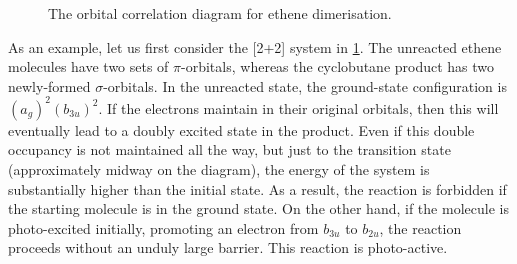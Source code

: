 \documentclass{article}
\theoremstyle{plain}\theoremheaderfont{\normalfont\itshape}\theorembodyfont{\rmfamily}\theoremseparator{.}\newtheorem*{rem}{Remark}\newtheorem*{ex}{Example}\newtheorem*{proof}{Proof}\newtheorem*{altp}{Alternative proof}
\theoremstyle{plain}\theoremheaderfont{\normalfont\bfseries}\theorembodyfont{\rmfamily}\theoremseparator{.}\newtheorem{thm}{Theorem}[section]\newtheorem{lem}[thm]{Lemma}\newtheorem{prop}[thm]{Proposition}\newtheorem*{cor}{Corollary}\newtheorem{defn}[thm]{Definition}\newtheorem{clm}[thm]{Claim}\newtheorem{clminproof}{Claim}\newtheorem{pos}{Postulate}[section]
\theoremstyle{break}\theoremheaderfont{\normalfont\itshape}\theorembodyfont{\rmfamily}\theoremseparator{.\medskip}\newtheorem*{proofskip}{Proof}\newtheorem*{exs}{Examples}\newtheorem*{rems}{Remarks}
\theoremstyle{break}\theoremheaderfont{\normalfont\bfseries}\theorembodyfont{\rmfamily}\theoremseparator{.\medskip}\newtheorem{lemskip}[thm]{Lemma}\newtheorem{defnskip}[thm]{Definition}\newtheorem{propskip}[thm]{Proposition}\newtheorem{thmskip}[thm]{Theorem}
\numberwithin{equation}{section}
\begin{document}
\begin{figure}
        \caption{The orbital correlation diagram for ethene dimerisation.}
        \label{ethene_correlation}
    \end{figure}

    As an example, let us first consider the [2+2] system in \cref{ethene_correlation}. The unreacted ethene molecules have two sets of \(\pi\)-orbitals, whereas the cyclobutane product has two newly-formed \(\sigma\)-orbitals. In the unreacted state, the ground-state configuration is \((a_g)^2(b_{3u})^2\). If the electrons maintain in their original orbitals, then this will eventually lead to a doubly excited state in the product. Even if this double occupancy is not maintained all the way, but just to the transition state (approximately midway on the diagram), the energy of the system is substantially higher than the initial state. As a result, the reaction is forbidden if the starting molecule is in the ground state. On the other hand, if the molecule is photo-excited initially, promoting an electron from \(b_{3u}\) to \(b_{2u}\), the reaction proceeds without an unduly large barrier. This reaction is photo-active.
\end{document}
